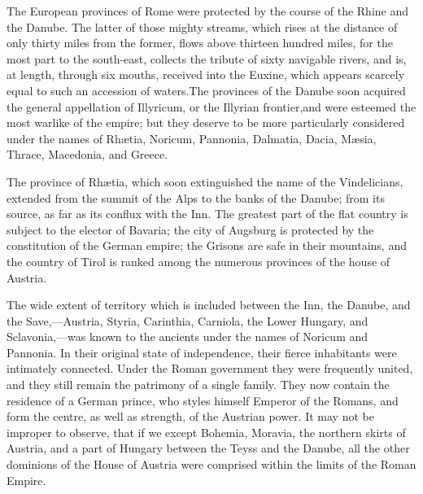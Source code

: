 The European provinces of Rome were protected by the course of
the Rhine and the Danube. The latter of those mighty streams,
which rises at the distance of only thirty miles from the former,
flows above thirteen hundred miles, for the most part to the
south-east, collects the tribute of sixty navigable rivers, and
is, at length, through six mouths, received into the Euxine,
which appears scarcely equal to such an accession of waters.\footnotemark[78]
The provinces of the Danube soon acquired the general appellation
of Illyricum, or the Illyrian frontier,\footnotemark[79] and were esteemed the
most warlike of the empire; but they deserve to be more
particularly considered under the names of Rhætia, Noricum,
Pannonia, Dalmatia, Dacia, Mæsia, Thrace, Macedonia, and Greece.



The province of Rhætia, which soon extinguished the name of the
Vindelicians, extended from the summit of the Alps to the banks
of the Danube; from its source, as far as its conflux with the
Inn. The greatest part of the flat country is subject to the
elector of Bavaria; the city of Augsburg is protected by the
constitution of the German empire; the Grisons are safe in their
mountains, and the country of Tirol is ranked among the numerous
provinces of the house of Austria.

The wide extent of territory which is included between the Inn,
the Danube, and the Save,—Austria, Styria, Carinthia, Carniola,
the Lower Hungary, and Sclavonia,—was known to the ancients under
the names of Noricum and Pannonia. In their original state of
independence, their fierce inhabitants were intimately connected.
Under the Roman government they were frequently united, and they
still remain the patrimony of a single family. They now contain
the residence of a German prince, who styles himself Emperor of
the Romans, and form the centre, as well as strength, of the
Austrian power. It may not be improper to observe, that if we
except Bohemia, Moravia, the northern skirts of Austria, and a
part of Hungary between the Teyss and the Danube, all the other
dominions of the House of Austria were comprised within the
limits of the Roman Empire.


